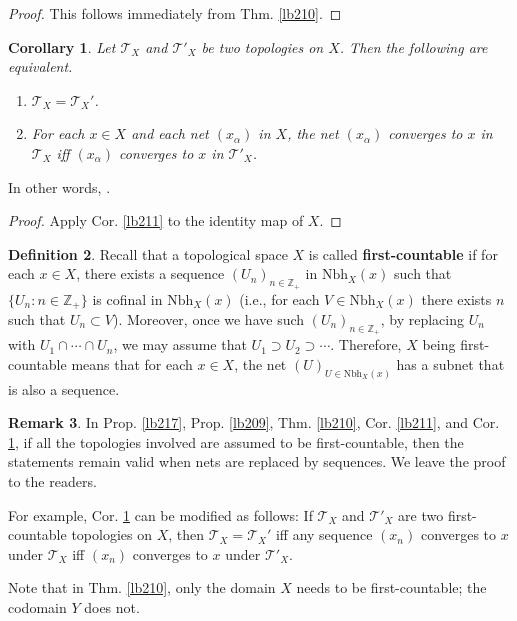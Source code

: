 \documentclass[12pt,b5paper,notitlepage]{article}
\theoremstyle{definition}
\newtheorem{df}{Definition}[subsection]
\newtheorem{rem}[df]{Remark}
\theoremstyle{plain}
\newtheorem{co}[df]{Corollary}
\newcommand{\Zbb}{\mathbb Z}
\newcommand{\Nbh}{\mathrm{Nbh}}
\newcommand{\MT}{\mathcal T}
\newcommand{\hqed}{\hfill\qedsymbol}
\numberwithin{equation}{section}
\begin{document}
\begin{proof}
This follows immediately from Thm. \ref{lb210}.
\end{proof}

\begin{co}\label{lb212}
Let $\MT_X$ and $\MT'_X$ be two topologies on $X$. Then the following are equivalent.
\begin{enumerate}
\item[(1)] $\MT_X=\MT_X'$.
\item[(2)] For each $x\in X$ and each net $(x_\alpha)$ in $X$, the net $(x_\alpha)$ converges to $x$ in $\MT_X$ iff $(x_\alpha)$ converges to $x$ in $\MT'_X$. 
\end{enumerate}
\end{co}

In other words, .


\begin{proof}
Apply Cor. \ref{lb211} to the identity map of $X$.
\end{proof}

\begin{df}
Recall that a topological space $X$ is called \textbf{first-countable}  if for each $x\in X$, there exists a sequence $(U_n)_{n\in\Zbb_+}$ in $\Nbh_X(x)$ such that $\{U_n:n\in\Zbb_+\}$ is cofinal in $\Nbh_X(x)$ (i.e., for each $V\in\Nbh_X(x)$ there exists $n$ such that $U_n\subset V$). Moreover, once we have such $(U_n)_{n\in\Zbb_+}$, by replacing $U_n$ with $U_1\cap\cdots\cap U_n$, we may assume that $U_1\supset U_2\supset\cdots$. Therefore, $X$ being first-countable means that for each $x\in X$, the net $(U)_{U\in\Nbh_X(x)}$ has a subnet that is also a sequence.
\end{df}


\begin{rem}\label{lb221}
In Prop. \ref{lb217}, Prop. \ref{lb209}, Thm. \ref{lb210}, Cor. \ref{lb211}, and Cor. \ref{lb212}, if all the topologies involved are assumed to be first-countable, then the statements remain valid when nets are replaced by sequences. We leave the proof to the readers. 

For example, Cor. \ref{lb212} can be modified as follows: If $\MT_X$ and $\MT'_X$ are two first-countable topologies on $X$, then $\MT_X=\MT_X'$ iff any sequence $(x_n)$ converges to $x$ under $\MT_X$ iff $(x_n)$ converges to $x$ under $\MT'_X$.


Note that in Thm. \ref{lb210}, only the domain $X$ needs to be first-countable; the codomain $Y$ does not. \hqed
\end{rem}
\end{document}
